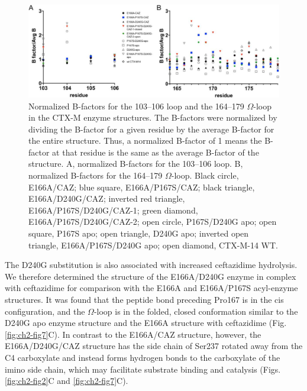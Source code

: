 \documentclass[../main.tex]{subfiles}
\begin{document}
        \begin{figure}[!htb] %
            \centering
            \includegraphics[width=4.7in]{ch2-fig6.jpg}
            \caption[Normalized B-factors for the 103–106 loop and the 164–179 $\Omega$-loop in the CTX-M enzyme structures.]
                {Normalized B-factors for the 103–106 loop and the 164–179 $\Omega$-loop in the CTX-M enzyme structures. The B-factors were normalized by dividing the B-factor for a given residue by the average B-factor for the entire structure. Thus, a normalized B-factor of 1 means the B-factor at that residue is the same as the average B-factor of the structure. A, normalized B-factors for the 103–106 loop. B, normalized B-factors for the 164–179 $\Omega$-loop. Black circle, E166A/CAZ; blue square, E166A/P167S/CAZ; black triangle, E166A/D240G/CAZ; inverted red triangle, E166A/P167S/D240G/CAZ-1; green diamond, E166A/P167S/D240G/CAZ-2; open circle, P167S/D240G apo; open square, P167S apo; open triangle, D240G apo; inverted open triangle, E166A/P167S/D240G apo; open diamond, CTX-M-14 WT.}
            \label{fig:ch2-fig6}
        \end{figure}

        The D240G substitution is also associated with increased ceftazidime hydrolysis\cite{bonnet_effect_2003,canton_ctx-m_2012}. We therefore determined the structure of the E166A/D240G enzyme in complex with ceftazidime for comparison with the E166A and E166A/P167S acyl-enzyme structures. It was found that the peptide bond preceding Pro167 is in the cis configuration, and the $\Omega$-loop is in the folded, closed conformation similar to the D240G apo enzyme structure and the E166A structure with ceftazidime (Fig. \ref{fig:ch2-fig7}C). In contrast to the E166A/CAZ structure, however, the E166A/D240G/CAZ structure has the side chain of Ser237 rotated away from the C4 carboxylate and instead forms hydrogen bonds to the carboxylate of the imino side chain, which may facilitate substrate binding and catalysis (Figs. \ref{fig:ch2-fig2}C and \ref{fig:ch2-fig7}C).
\end{document}
